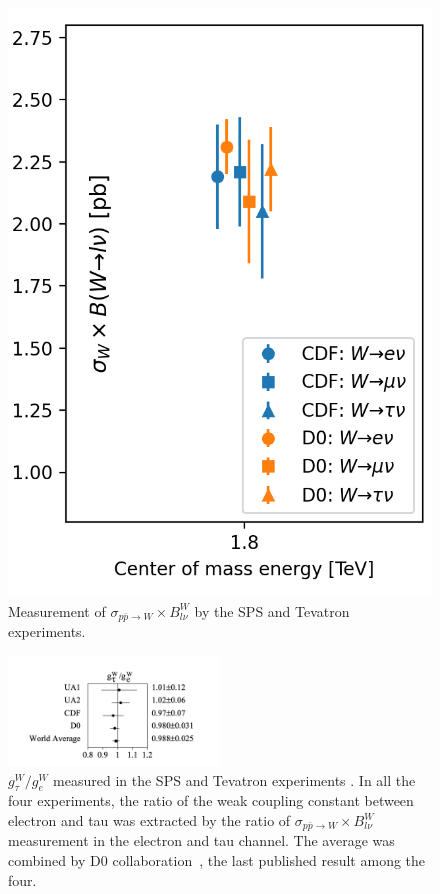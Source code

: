 \begin{figure}[ht]
    \includegraphics[height=0.35\textheight]{chapters/RelatedWorks/sectionLU/figures/tevatron.png}
    \caption{Measurement of $\sigma_{p\bar{p}\to W} \times B^W_{l \nu}$ by the SPS \cite{Albajar:1988ka} and Tevatron~\cite{Abazov:2003sv, Abbott:1999tt, Abachi:1995xc, Abbott:1999pk, Abe:1990sd, Abe:1992ys, Abe:1991fb} experiments.}
    \label{sec:relatedWorks:lu:W:spsTevatron}
\end{figure}


\begin{figure}[ht]
    \centering
    \includegraphics[width=0.5\textwidth]{chapters/RelatedWorks/sectionLU/figures/spsTevatron.png}
    \caption{ $g^W_\tau / g^W_e$ measured in the SPS and Tevatron experiments \cite{Abbott:1999pk}. In all the four experiments, the ratio of the weak coupling constant between electron and tau was extracted by the ratio of $\sigma_{p\bar{p}\to W} \times B^W_{l \nu}$ measurement in the electron and tau channel. The average was combined by D0 collaboration~\cite{Abbott:1999pk}, the last published result among the four.}
    \label{fig:relatedWorks:lu:W:spsTevatronCombinedRatio}
\end{figure}


